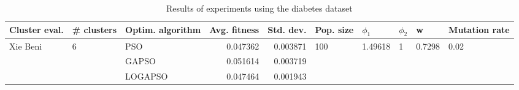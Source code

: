 \begin{table}
\centering
\caption{Results of experiments using the diabetes dataset}
\begin{tabular}{lllrrlllll}
\toprule
            Cluster eval. &        \# clusters & Optim. algorithm &  Avg. fitness &  Std. dev. &            Pop. size &               $\phi_{1}$ &         $\phi_{2}$ &                       w &         Mutation rate \\
\midrule
\multirow{3}{*}{Xie Beni} & \multirow{3}{*}{6} &              PSO &      0.047362 &   0.003871 & \multirow{3}{*}{100} & \multirow{3}{*}{1.49618} & \multirow{3}{*}{1} & \multirow{3}{*}{0.7298} & \multirow{3}{*}{0.02} \\
                          &                    &            GAPSO &      0.051614 &   0.003719 &                      &                          &                    &                         &                       \\
                          &                    &          LOGAPSO &      0.047464 &   0.001943 &                      &                          &                    &                         &                       \\
\bottomrule
\end{tabular}
\end{table}
